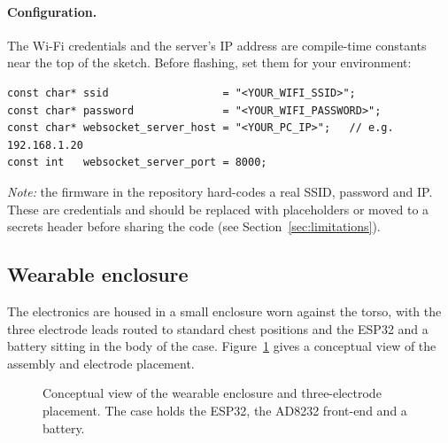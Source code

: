 \paragraph{Configuration.} The Wi-Fi credentials and the server's IP address are
compile-time constants near the top of the sketch. Before flashing, set them for
your environment:
\begin{lstlisting}[style=cpp,numbers=none]
const char* ssid                  = "<YOUR_WIFI_SSID>";
const char* password              = "<YOUR_WIFI_PASSWORD>";
const char* websocket_server_host = "<YOUR_PC_IP>";   // e.g. 192.168.1.20
const int   websocket_server_port = 8000;
\end{lstlisting}
\emph{Note:} the firmware in the repository hard-codes a real SSID, password and
IP. These are credentials and should be replaced with placeholders or moved to a
secrets header before sharing the code (see Section~\ref{sec:limitations}).

\subsection{Wearable enclosure}
The electronics are housed in a small enclosure worn against the torso, with the
three electrode leads routed to standard chest positions and the ESP32 and a
battery sitting in the body of the case. Figure~\ref{fig:case} gives a conceptual
view of the assembly and electrode placement.

\begin{figure}[h]
  \centering
  \caption{Conceptual view of the wearable enclosure and three-electrode
  placement. The case holds the ESP32, the AD8232 front-end and a battery.}
  \label{fig:case}
\end{figure}

